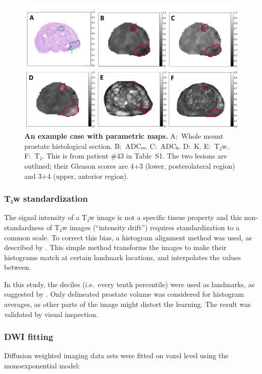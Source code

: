 \begin{figure}[!h]
    \centering
    \includegraphics[width=1.0\textwidth]{figures/fig2}
    \caption{{\bf An example case with parametric maps.}
    A:~Whole mount prostate histological section.
    B:~ADCₘ. C:~ADCₖ. D:~K. E:~T₂w. F:~T₂.
    This is from patient \#43 in Table~S1. The two lesions are outlined; their
    Gleason scores are 4+3 (lower, posterolateral region) and 3+4 (upper,
    anterior region).}%
    \label{fig:pmap}
\end{figure}

\subsubsection{T₂w standardization}

The signal intensity of a T₂w image is not a specific tissue property and
this non-standardness of T₂w images (``intensity drift'') requires
standardization to a common scale. To correct this bias, a histogram alignment
method was used, as described by \citet{Nyul1999,Nyul2000}. This simple method
transforms the images to make their histograms match at certain landmark
locations,  and interpolates the values between.

In this study, the deciles (i.e.\ every tenth percentile) were used as
landmarks, as suggested by \citet{Nyul1999}. Only delineated prostate volume was
considered for histogram averages, as other parts of the image might distort the
learning. The result was validated by visual inspection.

\subsubsection{DWI fitting}

Diffusion weighted imaging data sets were fitted on voxel level using the
monoexponential model:

